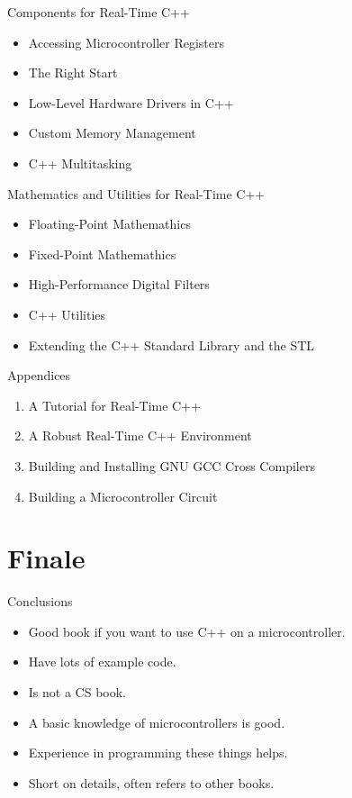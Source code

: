 \documentclass{beamer}
\begin{document}
\begin{frame}{Components for Real-Time C++}
  \begin{itemize}
  \item Accessing Microcontroller Registers
  \item The Right Start
  \item Low-Level Hardware Drivers in C++
  \item Custom Memory Management
  \item C++ Multitasking
  \end{itemize}
\end{frame}

\begin{frame}{Mathematics and Utilities for Real-Time C++}
  \begin{itemize}
  \item Floating-Point Mathemathics
  \item Fixed-Point Mathemathics
  \item High-Performance Digital Filters
  \item C++ Utilities
  \item Extending the C++ Standard Library and the STL
  \end{itemize}
\end{frame}

\begin{frame}{Appendices}
  \begin{enumerate}[A]
  \item A Tutorial for Real-Time C++
  \item A Robust Real-Time C++ Environment
  \item Building and Installing GNU GCC Cross Compilers
  \item Building a Microcontroller Circuit
  \end{enumerate}
\end{frame}



\section{Finale}

\begin{frame}{Conclusions}
\begin{itemize}
\item Good book if you want to use C++ on a microcontroller.
  \pause \item Have lots of example code.
  \pause \item Is not a CS book.
  \pause\item A basic knowledge of microcontrollers is good.
  \pause \item Experience in programming these things helps.
  \pause \item Short on details, often refers to other books.
\end{itemize}
\end{frame}
\end{document}
